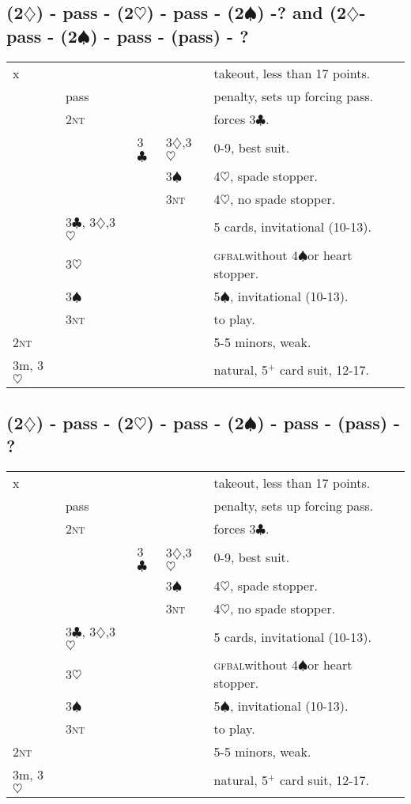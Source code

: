 \documentclass{article}
\newcommand{\bal}{\textsc{bal}}
\newcommand{\gf}{\textsc{gf}}
\renewcommand{\c}{\ensuremath{\clubsuit}}
\renewcommand{\d}{\ensuremath{\diamondsuit}}
\newcommand{\h}{\ensuremath{\heartsuit}}
\newcommand{\s}{\ensuremath{\spadesuit}}
\newcommand{\nt}{\textsc{nt}}
\newcommand{\+}{\ensuremath{^+}}
\begin{document}
\subsection{(2\d) - pass - (2\h) - pass - (2\s) -? and (2\d - pass - (2\s) - pass - (pass) - ?}
\begin{tabular}{lllll}
x &&&& takeout, less than 17 points.\\
& pass &&& penalty, sets up forcing pass.\\
& 2\nt &&& forces 3\c.\\
&& 3\c & 3\d,3\h & 0-9, best suit.\\
&&& 3\s & 4\h, spade stopper.\\
&&& 3\nt & 4\h, no spade stopper.\\
& 3\c, 3\d,3\h &&& 5 cards, invitational (10-13). \\
& 3\h &&& \gf \bal without 4\s or heart stopper.\\
& 3\s &&& 5\s, invitational (10-13).\\
& 3\nt &&& to play.\\
2\nt &&&& 5-5 minors, weak.\\
3m, 3\h &&&& natural, 5\+ card suit, 12-17.\\
\end{tabular}

\subsection{(2\d) - pass - (2\h) - pass - (2\s) - pass - (pass) - ?}
\begin{tabular}{lllll}
x &&&& takeout, less than 17 points.\\
& pass &&& penalty, sets up forcing pass.\\
& 2\nt &&& forces 3\c.\\
&& 3\c & 3\d,3\h & 0-9, best suit.\\
&&& 3\s & 4\h, spade stopper.\\
&&& 3\nt & 4\h, no spade stopper.\\
& 3\c, 3\d,3\h &&& 5 cards, invitational (10-13). \\
& 3\h &&& \gf \bal without 4\s or heart stopper.\\
& 3\s &&& 5\s, invitational (10-13).\\
& 3\nt &&& to play.\\
2\nt &&&& 5-5 minors, weak.\\
3m, 3\h &&&& natural, 5\+ card suit, 12-17.\\
\end{tabular}
\end{document}
